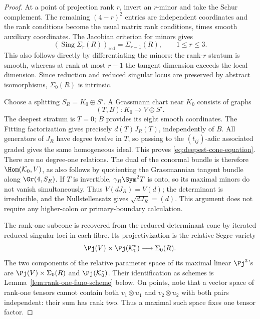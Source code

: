 \begin{proof}
At a point of projection rank \(r\), invert an \(r\)-minor
and take the Schur complement.  The remaining \((4-r)^2\)
entries are independent coordinates and the rank conditions become
the usual matrix rank conditions, times smooth auxiliary coordinates.
The Jacobian criterion for minors gives
\[
 (\operatorname{Sing}\Sigma_r(R))_{\mathrm{red}}
       =\Sigma_{r-1}(R),\qquad 1\le r\le3.
\]
This also follows directly by differentiating the minors: the
rank-\(r\) stratum is smooth, whereas at rank at most \(r-1\)
the tangent dimension exceeds the local dimension.  Since reduction
and reduced singular locus are preserved by abstract isomorphisms,
\(\Sigma_0(R)\) is intrinsic.

Choose a splitting \(S_R=K_0\oplus S'\).  A Grassmann chart
near \(K_0\) consists of graphs
\[
 (T,B):K_0\longrightarrow V\oplus S'.
\]
The deepest stratum is \(T=0\); \(B\) provides its eight
smooth coordinates.  The Fitting factorization gives precisely
\(d(T)J_R(T)\), independently of \(B\).  All generators of
\(J_R\) have degree twelve in \(T\), so passing to the
\((t_{ij})\)-adic associated graded gives the same homogeneous
ideal.  This proves \eqref{eq:deepest-cone-equation}.  There are
no degree-one relations.  The dual of the conormal bundle is therefore
\(\Hom(\mathcal K_0,V)\), as also follows by quotienting the
Grassmannian tangent bundle along \(\Gr(4,S_R)\).  If \(T\) is invertible, \(\gamma_R\Sym^2T\) is onto,
so its maximal minors do not vanish simultaneously.  Thus
\(V(dJ_R)=V(d)\); the determinant is irreducible, and the
Nullstellensatz gives \(\sqrt{dJ_R}=(d)\).  This argument
does not require any higher-colon or primary-boundary calculation.

The rank-one subcone is recovered from the reduced determinant cone
by iterated reduced singular loci in each fibre.  Its projectivization
is the relative Segre variety
\[
 \Pj(V)\times\Pj(\mathcal K_0^*)
          \longrightarrow\Sigma_0(R).
\]
The two components of the relative parameter space of its maximal
linear \(\Pj^3\)'s are \(\Pj(V)\times\Sigma_0(R)\)
and \(\Pj(\mathcal K_0^*)\).  Their identification as schemes is
Lemma~\ref{lem:rank-one-fano-scheme} below.  On points, note that a vector space of rank-one tensors
cannot contain both \(v_1\otimes u_1\) and
\(v_2\otimes u_2\) with both pairs independent: their sum has
rank two.  Thus a maximal such space fixes one tensor factor.


\end{proof}
